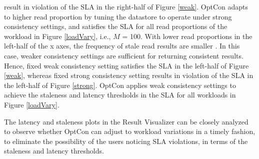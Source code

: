 \documentclass[conference]{IEEEtran}
\begin{document}
   result in violation of the SLA in the right-half of Figure \ref{weak}.
  OptCon adapts to higher read proportion by tuning the datastore to operate under strong consistency settings, and satisfies the SLA for all read proportions of the workload in Figure \ref{loadVary}, i.e., $M$ = 100.  %
 With lower read proportions in the left-half of the x axes, the frequency of stale read results are smaller \cite{DBLP:conf/cloud/GolabRAKWG13}. In this case,
weaker consistency settings are sufficient for returning
consistent results. Hence, fixed weak consistency setting
   satisfies the SLA in the left-half of Figure \ref{weak}, whereas fixed strong consistency setting
   results in violation of the SLA in the left-half of Figure \ref{strong}. OptCon applies weak consistency settings to achieve the staleness and latency thresholds in the SLA for all workloads in Figure \ref{loadVary}.
  \par The latency and staleness plots in the Result Visualizer can be closely analyzed to observe whether OptCon can adjust to workload variations in a timely fashion, to eliminate the possibility of the users noticing SLA violations, in terms of the staleness and latency thresholds.
\end{document}
